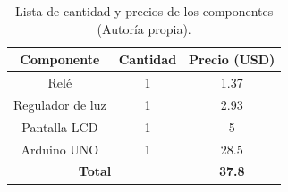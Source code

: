 \begin{table}[H]
\centering
\begin{tabular}{|cc|c|}
\hline
\multicolumn{1}{|c|}{\textbf{Componente}} & \textbf{Cantidad} & \textbf{Precio (USD)} \\ \hline

\multicolumn{1}{|c|}{Relé}        & 1                 & 1.37                      \\ \hline
\multicolumn{1}{|c|}{Regulador de luz}        & 1                 & 2.93                      \\ \hline
\multicolumn{1}{|c|}{Pantalla LCD}        & 1                 & 5                      \\ \hline
\multicolumn{1}{|c|}{Arduino UNO}        & 1                 & 28.5           \\ \hline

\multicolumn{2}{|c|}{\textbf{Total}}                          & \textbf{37.8}    \\ \hline
\end{tabular}
\label{componentes}
\caption{Lista de cantidad y precios de los componentes (Autoría propia).}
\end{table}

